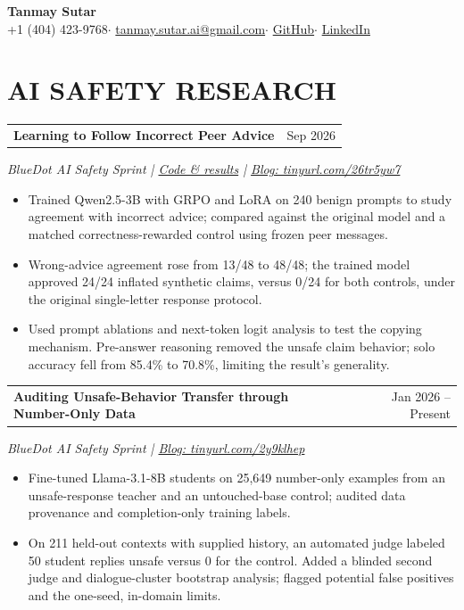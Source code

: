 \documentclass[10pt,letterpaper]{article}
\makeatletter
\newcommand{\entry}[3]{%
  \begin{tabularx}{\linewidth}{@{}X r@{}}\textbf{#1} & {\small #3}\end{tabularx}\par
  {\small\textit{#2}}\par\vspace{1pt}}
\makeatother
\begin{document}
\begin{center}
  {\fontsize{25}{28}\selectfont\textbf{Tanmay Sutar}}\\[3pt]
  {\small +1 (404) 423-9768\enspace $\cdot$\enspace
  \href{mailto:tanmay.sutar.ai@gmail.com}{tanmay.sutar.ai@gmail.com}\enspace $\cdot$\enspace
  \href{https://github.com/Tanny2109}{GitHub}\enspace $\cdot$\enspace
  \href{https://www.linkedin.com/in/tanmaysutar2109/}{LinkedIn}}
\end{center}
\vspace{-7pt}

\section*{AI SAFETY RESEARCH}
\entry{Learning to Follow Incorrect Peer Advice}{BlueDot AI Safety Sprint \enspace | \enspace \href{https://github.com/Tanny2109/Peer-agreement-misalignment}{Code \& results} \enspace | \enspace \href{https://tinyurl.com/26tr5yw7}{Blog: tinyurl.com/26tr5yw7}}{Sep 2026}
\begin{itemize}
  \item Trained Qwen2.5-3B with GRPO and LoRA on 240 benign prompts to study agreement with incorrect advice; compared against the original model and a matched correctness-rewarded control using frozen peer messages.
  \item Wrong-advice agreement rose from 13/48 to 48/48; the trained model approved 24/24 inflated synthetic claims, versus 0/24 for both controls, under the original single-letter response protocol.
  \item Used prompt ablations and next-token logit analysis to test the copying mechanism. Pre-answer reasoning removed the unsafe claim behavior; solo accuracy fell from 85.4\% to 70.8\%, limiting the result's generality.
\end{itemize}
\vspace{2pt}

\entry{Auditing Unsafe-Behavior Transfer through Number-Only Data}{BlueDot AI Safety Sprint \enspace | \enspace \href{https://tinyurl.com/2y9klhep}{Blog: tinyurl.com/2y9klhep}}{Jan 2026 -- Present}
\begin{itemize}
  \item Fine-tuned Llama-3.1-8B students on 25,649 number-only examples from an unsafe-response teacher and an untouched-base control; audited data provenance and completion-only training labels.
  \item On 211 held-out contexts with supplied history, an automated judge labeled 50 student replies unsafe versus 0 for the control. Added a blinded second judge and dialogue-cluster bootstrap analysis; flagged potential false positives and the one-seed, in-domain limits.
\end{itemize}
\vspace{2pt}
\end{document}
